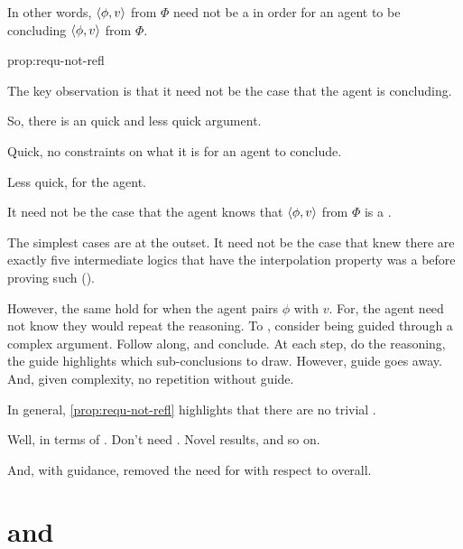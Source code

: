 \begin{note}
  In other words, \(\langle \phi, v \rangle\) from \(\Phi\) need not be a \fc{} in order for an agent to be concluding \(\langle \phi, v \rangle\) from \(\Phi\).

  \begin{argument}{prop:requ-not-refl}
    {
      \color{red}
      The key observation is that it need not be the case that the agent is concluding.

      So, there is an quick and less quick argument.

      Quick, no constraints on what it is for an agent to conclude.

      Less quick, \fc{} for the agent.
    }


    It need not be the case that the agent knows that \(\langle \phi, v \rangle\) from \(\Phi\) is a \fc{}.

    The simplest cases are at the outset.
    It need not be the case that \citeauthor{Maksimova:1977un} knew there are exactly five intermediate logics that have the interpolation property was a \fc{} before proving such (\cite[cf.][]{Maksimova:1977un}).

    However, the same hold for when the agent pairs \(\phi\) with \(v\).
    For, the agent need not know they would repeat the reasoning.
    To , consider being guided through a complex argument.
    Follow along, and conclude.
    At each step, do the reasoning, the guide highlights which sub-conclusions to draw.
    However, guide goes away.
    And, given complexity, no repetition without guide.
  \end{argument}

  In general, \autoref{prop:requ-not-refl} highlights that there are no trivial .

  Well, in terms of \tR{}.
  Don't need \tR{}.
  Novel results, and so on.

  And, with guidance, removed the need for \tR{} with respect to overall.
\end{note}

\section{ and }
\label{cha:requs:sec:add-illu}

